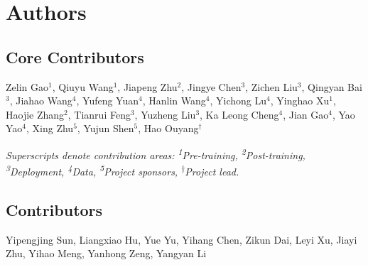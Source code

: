 \section{Authors}\label{sec:authors}

\subsection{Core Contributors}

Zelin Gao$^1$, Qiuyu Wang$^1$, Jiapeng Zhu$^2$, Jingye Chen$^3$, Zichen Liu$^3$, Qingyan Bai$^3$, Jiahao Wang$^4$, Yufeng Yuan$^4$, Hanlin Wang$^4$, Yichong Lu$^4$, Yinghao Xu$^1$, Haojie Zhang$^2$, Tianrui Feng$^3$, Yuzheng Liu$^3$, Ka Leong Cheng$^4$, Jian Gao$^4$,  Yao Yao$^4$,  Xing Zhu$^5$, Yujun Shen$^5$, Hao Ouyang$^{\dagger}$

\vspace{5pt}
\noindent\textit{Superscripts denote contribution areas: \textsuperscript{1}Pre-training, \textsuperscript{2}Post-training, \textsuperscript{3}Deployment, \textsuperscript{4}Data, \textsuperscript{5}Project sponsors, \textsuperscript{$\dagger$}Project lead.}

\subsection{Contributors}
Yipengjing Sun, Liangxiao Hu, Yue Yu, Yihang Chen, Zikun Dai, Leyi Xu, Jiayi Zhu, Yihao Meng, Yanhong Zeng, Yangyan Li 